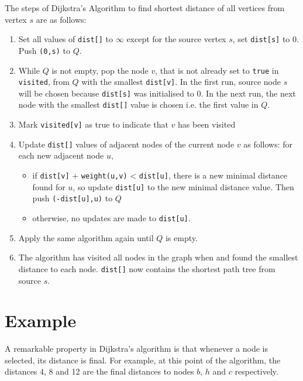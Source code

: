 \documentclass[twoside,12pt,a4paper,english]{book}
\theoremstyle{definition}
\theoremstyle{problemstyle}
\theoremstyle{problemstyle}
\theoremstyle{problemstyle}
\begin{document}
The steps of Dijkstra's Algorithm to find shortest distance of all vertices from vertex $s$ are as follows:
\begin{enumerate}

    \item Set all values of \texttt{dist[]} to $\infty$ except for the source vertex $s$, set \texttt{dist[s]} to $0$. Push \texttt{(0,s)} to $Q$.
    \item While $Q$ is not empty, pop the node $v$, that is not already set to \texttt{true} in \texttt{visited}, from $Q$ with the smallest \texttt{dist[v]}. In the first run, source node $s$ will be chosen because \texttt{dist[s]} was initialised to $0$. In the next run, the next node with the smallest \texttt{dist[]} value is chosen i.e. the first value in $Q$.
    \item Mark \texttt{visited[v]} as true to indicate that $v$ has been visited
    \item Update \texttt{dist[]} values of adjacent nodes of the current node $v$ as follows: for each new adjacent node $u$,
    \begin{itemize}
        \item if \texttt{dist[v]} $+$ \texttt{weight(u,v)} < \texttt{dist[u]}, there is a new minimal distance found for $u$, so update \texttt{dist[u]} to the new minimal distance value. Then push \texttt{(-dist[u],u)} to $Q$
        \item otherwise, no updates are made to \texttt{dist[u]}.
    \end{itemize}
    \item Apply the same algorithm again until $Q$ is empty.
    \item The algorithm has visited all nodes in the graph when  and found the smallest distance to each node. \texttt{dist[]} now contains the shortest path tree from source $s$.
\end{enumerate}

\section{Example}

\centerline{}

A remarkable property in Dijkstra’s algorithm is that whenever a node is
selected, its distance is final. For example, at this point of the algorithm, the
distances 4, 8 and 12 are the final distances to nodes $b$, $h$ and $c$ respectively.
\end{document}
